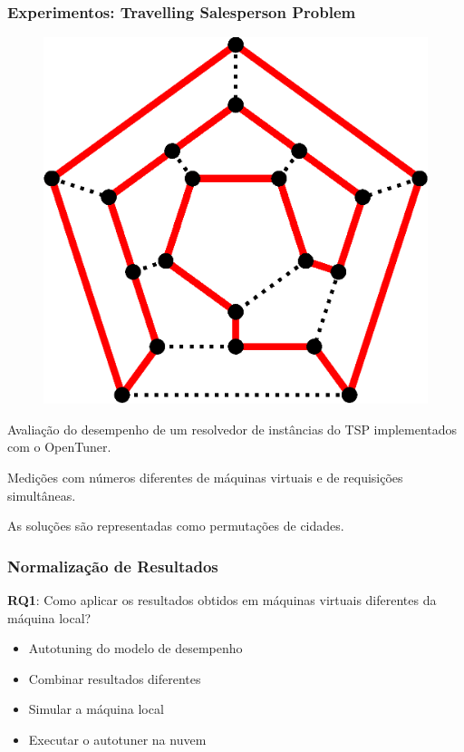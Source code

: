 \documentclass[10pt, compress]{beamer}
\begin{document}
\begin{frame}[fragile]
    \frametitle{Experimentos: Travelling Salesperson Problem}
    \begin{figure}[H]
        \centering
        \includegraphics[width=.33\textwidth]{hamiltonianpath}
    \end{figure}%
    \alert{Avaliação do desempenho} de um resolvedor de
    instâncias do TSP implementados com o OpenTuner. 

    Medições com números diferentes de \alert{máquinas virtuais} e de
    \alert{requisições simultâneas}.

    As soluções são representadas como \alert{permutações} de cidades.
\end{frame}

\begin{frame}[fragile]
  \frametitle{Normalização de Resultados}
  \textbf{RQ1}: Como aplicar os resultados obtidos em máquinas virtuais
  \alert{diferentes da máquina local}?

  \begin{itemize}
      \item Autotuning do \alert{modelo de desempenho}
      \item \alert{Combinar} resultados diferentes
      \item \alert{Simular} a máquina local
      \item Executar o autotuner na \alert{nuvem}
  \end{itemize}
\end{frame}


\maketitle
\end{document}
